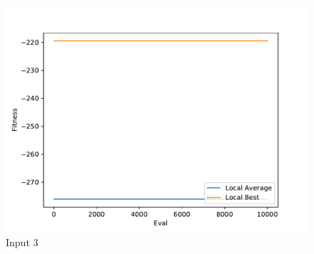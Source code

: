 \documentclass{standalone}
\begin{document}
\begin{figure}[!htb]
	\caption{Input 3}
	\label{fig:graph_3003}
	\includegraphics[width=\textwidth]{../graphs/graphs/3003.pdf}
\end{figure}
\end{document}
